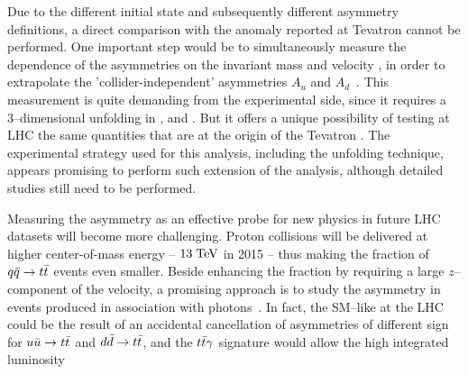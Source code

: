 Due to the different initial state and subsequently different
asymmetry definitions, a direct comparison with the anomaly reported
at Tevatron cannot be performed. One important step would be to
simultaneously measure the dependence of the asymmetries on the
\ttbar{} invariant mass \mtt{} and velocity \betatt{}, in order to
extrapolate the 'collider-independent' asymmetries $A_u$ and
$A_d$~\cite{AguilarSaavedra:2012va}. This measurement is quite
demanding from the experimental side, since it requires a
3--dimensional unfolding in \mtt{}, \betatt{} and \dy{}. But it offers
a unique possibility of testing at LHC the same quantities that are at
the origin of the Tevatron \afb{}.
The experimental strategy used for this analysis, including the
unfolding technique, appears promising to perform such extension of
the analysis, although detailed studies still need to be performed.

Measuring the asymmetry \ac{} as an effective probe for new physics in
future LHC datasets will become more challenging. Proton collisions
will be delivered at higher center-of-mass energy -- $13\; \mathrm{TeV}{}$ in
2015 -- thus making the fraction of $q\bar{q}{}\to t\bar{t}{}$ events even
smaller. Beside enhancing the \qqbar{} fraction by requiring a large
$z$--component of the \ttbar{} velocity, a promising approach is to
study the asymmetry in \ttbar{} events produced in association with
photons~\cite{Aguilar-Saavedra:2014vta}. 
In fact, the SM--like \ac{} at the LHC could be the result of an accidental
cancellation of asymmetries of different sign for $u\bar{u}\to t\bar{t}$
and $d\bar{d}\to t\bar{t}$, and the $t\bar{t}{}\gamma$ signature would allow
the 
high integrated luminosity

